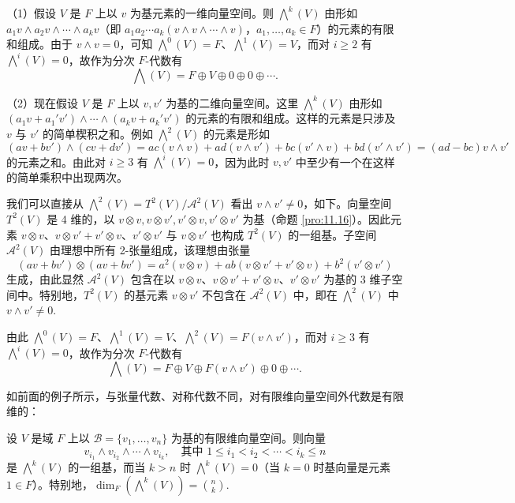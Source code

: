 \begin{example}
（1）假设 \(V\) 是 \(F\) 上以 \(v\) 为基元素的一维向量空间。则 \(\bigwedge^k(V)\) 由形如 \(a_1v \wedge a_2v \wedge \cdots \wedge a_kv\)（即 \(a_1a_2\cdots a_k(v \wedge v \wedge \cdots \wedge v)\)，\(a_1, \ldots, a_k \in F\)）的元素的有限和组成。由于 \(v \wedge v = 0\)，可知 \(\bigwedge^0(V) = F\)、\(\bigwedge^1(V) = V\)，而对 \(i \geq 2\) 有 \(\bigwedge^i(V) = 0\)，故作为分次 \(F\)-代数有
\[
\bigwedge(V) = F \oplus V \oplus 0 \oplus 0 \oplus \cdots.
\]

（2）现在假设 \(V\) 是 \(F\) 上以 \(v, v'\) 为基的二维向量空间。这里 \(\bigwedge^k(V)\) 由形如 \((a_1v+a_1'v') \wedge \cdots \wedge (a_kv+a_k'v')\) 的元素的有限和组成。这样的元素是只涉及 \(v\) 与 \(v'\) 的简单楔积之和。例如 \(\bigwedge^2(V)\) 的元素是形如
\[
(av+bv') \wedge (cv+dv') = ac(v \wedge v)+ad(v \wedge v')+bc(v' \wedge v)+bd(v' \wedge v') = (ad-bc)v \wedge v'
\]
的元素之和。由此对 \(i \geq 3\) 有 \(\bigwedge^i(V) = 0\)，因为此时 \(v, v'\) 中至少有一个在这样的简单乘积中出现两次。

我们可以直接从 \(\bigwedge^2(V) = T^2(V)/\mathcal{A}^2(V)\) 看出 \(v \wedge v' \neq 0\)，如下。向量空间 \(T^2(V)\) 是 4 维的，以 \(v \otimes v, v \otimes v', v' \otimes v, v' \otimes v'\) 为基（命题 \ref{pro:11.16}）。因此元素 \(v \otimes v\)、\(v \otimes v'+v' \otimes v\)、\(v' \otimes v'\) 与 \(v \otimes v'\) 也构成 \(T^2(V)\) 的一组基。子空间 \(\mathcal{A}^2(V)\) 由理想中所有 2-张量组成，该理想由张量
\[
(av+bv') \otimes (av+bv') = a^2(v \otimes v)+ab(v \otimes v'+v' \otimes v)+b^2(v' \otimes v')
\]
生成，由此显然 \(\mathcal{A}^2(V)\) 包含在以 \(v \otimes v\)、\(v \otimes v'+v' \otimes v\)、\(v' \otimes v'\) 为基的 3 维子空间中。特别地，\(T^2(V)\) 的基元素 \(v \otimes v'\) 不包含在 \(\mathcal{A}^2(V)\) 中，即在 \(\bigwedge^2(V)\) 中 \(v \wedge v' \neq 0\).

由此 \(\bigwedge^0(V) = F\)、\(\bigwedge^1(V) = V\)、\(\bigwedge^2(V) = F(v \wedge v')\)，而对 \(i \geq 3\) 有 \(\bigwedge^i(V) = 0\)，故作为分次 \(F\)-代数有
\[
\bigwedge(V) = F \oplus V \oplus F(v \wedge v') \oplus 0 \oplus \cdots.
\]
\end{example}

如前面的例子所示，与张量代数、对称代数不同，对有限维向量空间外代数是有限维的：

\begin{corollary}\label{cor:11.37}
设 \(V\) 是域 \(F\) 上以 \(\mathcal{B} = \{v_1, \ldots, v_n\}\) 为基的有限维向量空间。则向量
\[
v_{i_1} \wedge v_{i_2} \wedge \cdots \wedge v_{i_k}, \quad \text{其中 } 1 \leq i_1 < i_2 < \cdots < i_k \leq n
\]
是 \(\bigwedge^k(V)\) 的一组基，而当 \(k > n\) 时 \(\bigwedge^k(V) = 0\)（当 \(k = 0\) 时基向量是元素 \(1 \in F\)）。特别地，\(\dim_F(\bigwedge^k(V)) = \binom{n}{k}\).
\end{corollary}

